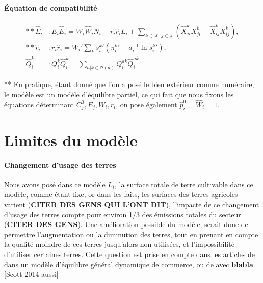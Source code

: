 \paragraph{Équation de compatibilité}
\begin{align}
    ** \hat{E}_i & : E_i \hat{E}_i = W_i \hat{W}_i N_i + r_i \hat{r}_i L_i + \sum_{k \in \mathcal{K},j \in \mathcal{J}} \left(\hat{X}_{ji}^k X_{ji}^k - \hat{X}_{ij}^k X_{ij}^k \right), \\
    ** \hat{r}_i & : r_i \hat{r}_i = W_i\prime \sum_k {s_i^k}\prime \left( {\pi_i^k}\prime -a_i^{-1} \ln {s_i^k}\prime\right),                                                           \\
    \hat{Q}_i^k  & : Q_i^k \hat{Q}_i^k = \sum_{a|k\in \mathcal{O}(a)} Q_i^{ak} \hat{Q}_i^{ak}.
\end{align}

** En pratique, étant donné que l’on a posé le bien extérieur comme numéraire, le modèle est un modèle d’équilibre partiel, ce qui fait que nous fixons les équations déterminant $C_j^0, E_j, W_i, r_i$, on pose également $\hat{p}_i^0=\hat{W}_i=1$.



\section{Limites du modèle}

\paragraph{Changement d’usage des terres} Nous avons posé dans ce modèle $L_i$, la surface totale de terre cultivable dans ce modèle, comme étant fixe, or dans les faits, les surfaces des terres agricoles varient (\textbf{CITER DES GENS QUI L’ONT DIT}), l’impacte de ce changement d’usage des terres compte pour environ 1/3 des émissions totales du secteur (\textbf{CITER DES GENS}). Une amélioration possible du modèle, serait donc de permettre l’augmentation ou la diminution des terres, tout en prenant en compte la qualité moindre de ces terres jusqu’alors non utilisées, et l’impossibilité d’utiliser certaines terres. Cette question est prise en compte dans les articles de \cite{Farrokhi2023} dans un modèle d'équilibre général dynamique de commerce, ou de \cite{Costinot2016} avec \textbf{blabla}. [Scott 2014 aussi]

